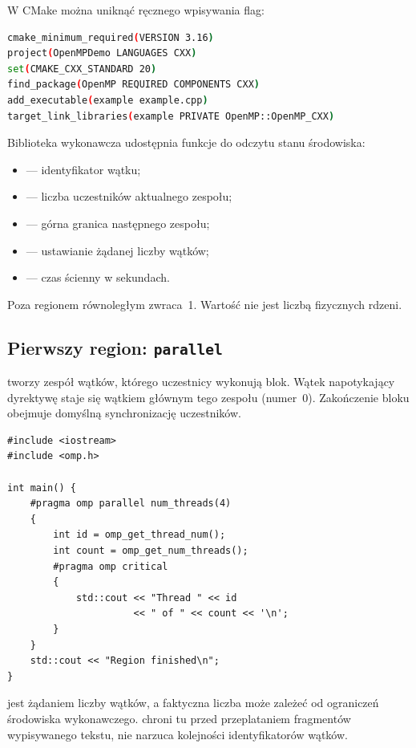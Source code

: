 W CMake można uniknąć ręcznego wpisywania flag:
\begin{lstlisting}[language=bash,caption={Minimalny CMakeLists.txt (tekst pliku).}]
cmake_minimum_required(VERSION 3.16)
project(OpenMPDemo LANGUAGES CXX)
set(CMAKE_CXX_STANDARD 20)
find_package(OpenMP REQUIRED COMPONENTS CXX)
add_executable(example example.cpp)
target_link_libraries(example PRIVATE OpenMP::OpenMP_CXX)
\end{lstlisting}

Biblioteka wykonawcza udostępnia funkcje do odczytu stanu środowiska:
\begin{itemize}
\item {} --- identyfikator wątku;
\item {} --- liczba uczestników aktualnego zespołu;
\item {} --- górna granica następnego zespołu;
\item {} --- ustawianie żądanej liczby wątków;
\item {} --- czas ścienny w sekundach.
\end{itemize}
Poza regionem równoległym  zwraca~1.
Wartość  nie jest liczbą fizycznych rdzeni.

\subsection{Pierwszy region: \texttt{parallel}}

 tworzy zespół wątków, którego uczestnicy
wykonują blok. Wątek napotykający dyrektywę staje się wątkiem
głównym tego zespołu (numer~0). Zakończenie bloku obejmuje domyślną
synchronizację uczestników.

\begin{lstlisting}[caption={Region równoległy OpenMP.}]
#include <iostream>
#include <omp.h>

int main() {
    #pragma omp parallel num_threads(4)
    {
        int id = omp_get_thread_num();
        int count = omp_get_num_threads();
        #pragma omp critical
        {
            std::cout << "Thread " << id
                      << " of " << count << '\n';
        }
    }
    std::cout << "Region finished\n";
}
\end{lstlisting}

 jest żądaniem liczby wątków, a faktyczna liczba
może zależeć od ograniczeń środowiska wykonawczego. 
chroni tu przed przeplataniem fragmentów wypisywanego tekstu,
nie narzuca kolejności identyfikatorów wątków.


